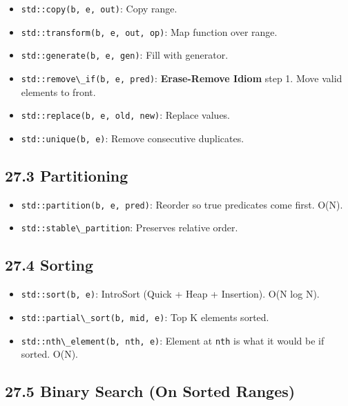 \begin{itemize}
\tightlist
\item
  \passthrough{\lstinline!std::copy(b, e, out)!}: Copy range.
\item
  \passthrough{\lstinline!std::transform(b, e, out, op)!}: Map function
  over range.
\item
  \passthrough{\lstinline!std::generate(b, e, gen)!}: Fill with
  generator.
\item
  \passthrough{\lstinline!std::remove\_if(b, e, pred)!}:
  \textbf{Erase-Remove Idiom} step 1. Move valid elements to front.
\item
  \passthrough{\lstinline!std::replace(b, e, old, new)!}: Replace
  values.
\item
  \passthrough{\lstinline!std::unique(b, e)!}: Remove consecutive
  duplicates.
\end{itemize}

\hypertarget{partitioning}{%
\subsection{27.3 Partitioning}\label{partitioning}}

\begin{itemize}
\tightlist
\item
  \passthrough{\lstinline!std::partition(b, e, pred)!}: Reorder so true
  predicates come first. O(N).
\item
  \passthrough{\lstinline!std::stable\_partition!}: Preserves relative
  order.
\end{itemize}

\hypertarget{sorting}{%
\subsection{27.4 Sorting}\label{sorting}}

\begin{itemize}
\tightlist
\item
  \passthrough{\lstinline!std::sort(b, e)!}: IntroSort (Quick + Heap +
  Insertion). O(N log N).
\item
  \passthrough{\lstinline!std::partial\_sort(b, mid, e)!}: Top K
  elements sorted.
\item
  \passthrough{\lstinline!std::nth\_element(b, nth, e)!}: Element at
  \passthrough{\lstinline!nth!} is what it would be if sorted. O(N).
\end{itemize}

\hypertarget{binary-search-on-sorted-ranges}{%
\subsection{27.5 Binary Search (On Sorted
Ranges)}\label{binary-search-on-sorted-ranges}}

